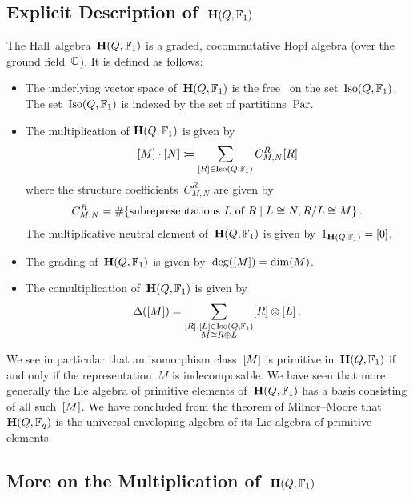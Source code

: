 \documentclass[a4paper,11pt]{scrartcl}
\begin{document}
\subsection{Explicit Description of~$\mathbf{H}(Q, \mathbb{F}_1)$}
\label{explicit description of hall algebra over F1}

The Hall~algebra~$\mathbf{H}(Q, \mathbb{F}_1)$ is a graded, cocommutative Hopf algebra (over the ground field~$\Complex$).
It is defined as follows:
\begin{itemize}
  \item
    The underlying vector space of~$\mathbf{H}(Q, \mathbb{F}_1)$ is the free~\vectorspace{$\Complex$} on the set~$\operatorname{Iso}(Q, \mathbb{F}_1)$.
    The set~$\operatorname{Iso}(Q, \mathbb{F}_1)$ is indexed by the set of partitions~$\mathrm{Par}$.
  \item
    The multiplication of$~\mathbf{H}(Q, \mathbb{F}_1)$ is given by
    \[
      [M] \cdot [N]
      \coloneqq
      \sum_{[R] \in \operatorname{Iso}(Q, \mathbb{F}_1)}
      C^R_{M,N} [R]
    \]
    where the structure coefficients~$C^R_{M,N}$ are given by
    \[
      C^R_{M,N}
      =
      \counting
      \{
        \text{subrepresentations~$L$ of~$R$}
      \suchthat
        L \cong N, R/L \cong M
      \} \,.
    \]
    The multiplicative neutral element of~$\mathbf{H}(Q, \mathbb{F}_1)$ is given by~$1_{\mathbf{H}(Q, \mathbb{F}_1)} = [0]$.
  \item
    The grading of~$\mathbf{H}(Q, \mathbb{F}_1)$ is given by~$\deg( [M] ) = \dim(M)$.
  \item
    The comultiplication of~$\mathbf{H}(Q, \mathbb{F}_1)$ is given by
    \[
      \Delta( [M] )
      =
      \sum_{
        \substack{
          [R], [L] \in \operatorname{Iso}(Q, \mathbb{F}_1) \\
          M \cong R \oplus L
        }
      }
      [R] \otimes [L] \,.
    \]
\end{itemize}

We see in particular that an isomorphism class~$[M]$ is primitive in~$\mathbf{H}(Q, \mathbb{F}_1)$ if and only if the representation~$M$ is indecomposable.
We have seen that more generally the Lie algebra of primitive elements of~$\mathbf{H}(Q, \mathbb{F}_1)$ has a basis consisting of all such~$[M]$.
We have concluded from the theorem of Milnor--Moore that~$\mathbf{H}(Q, \mathbb{F}_q)$ is the universal enveloping algebra of its Lie algebra of primitive elements.



\subsection{More on the Multiplication of~$\mathbf{H}(Q, \mathbb{F}_1)$}
\label{more on multiplication}
\end{document}
